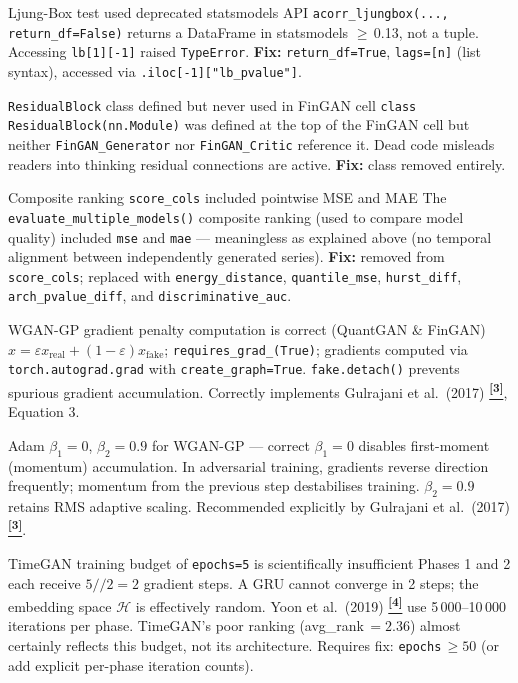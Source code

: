 \documentclass[10pt]{article}
\newcommand{\tcite}[1]{%
  \hyperlink{R:#1}{\textsuperscript{\scriptsize\textbf{[#1]}}}}
\begin{document}
%
  {Ljung-Box test used deprecated statsmodels API}%
  {\texttt{acorr\_ljungbox(..., return\_df=False)} returns a DataFrame in statsmodels $\geq$\,0.13, not a tuple. Accessing \texttt{lb[1][-1]} raised \texttt{TypeError}. \textbf{Fix:} \texttt{return\_df=True}, \texttt{lags=[n]} (list syntax), accessed via \texttt{.iloc[-1]["lb\_pvalue"]}.}

%
  {\texttt{ResidualBlock} class defined but never used in FinGAN cell}%
  {\texttt{class ResidualBlock(nn.Module)} was defined at the top of the FinGAN cell but neither \texttt{FinGAN\_Generator} nor \texttt{FinGAN\_Critic} reference it. Dead code misleads readers into thinking residual connections are active. \textbf{Fix:} class removed entirely.}

%
  {Composite ranking \texttt{score\_cols} included pointwise MSE and MAE}%
  {The \texttt{evaluate\_multiple\_models()} composite ranking (used to compare model quality) included \texttt{mse} and \texttt{mae} --- meaningless as explained above (no temporal alignment between independently generated series). \textbf{Fix:} removed from \texttt{score\_cols}; replaced with \texttt{energy\_distance}, \texttt{quantile\_mse}, \texttt{hurst\_diff}, \texttt{arch\_pvalue\_diff}, and \texttt{discriminative\_auc}.}

%
  {WGAN-GP gradient penalty computation is correct (QuantGAN \& FinGAN)}%
  {$\hat{x} = \varepsilon x_\text{real} + (1-\varepsilon)x_\text{fake}$; \texttt{requires\_grad\_(True)}; gradients computed via \texttt{torch.autograd.grad} with \texttt{create\_graph=True}. \texttt{fake.detach()} prevents spurious gradient accumulation. Correctly implements Gulrajani et al.\ (2017)\tcite{3}, Equation 3.}

%
  {Adam $\beta_1=0$, $\beta_2=0.9$ for WGAN-GP --- correct}%
  {$\beta_1=0$ disables first-moment (momentum) accumulation. In adversarial training, gradients reverse direction frequently; momentum from the previous step destabilises training. $\beta_2=0.9$ retains RMS adaptive scaling. Recommended explicitly by Gulrajani et al.\ (2017)\tcite{3}.}

%
  {TimeGAN training budget of \texttt{epochs=5} is scientifically insufficient}%
  {Phases 1 and 2 each receive $5//2=2$ gradient steps. A GRU cannot converge in 2 steps; the embedding space $\mathcal{H}$ is effectively random. Yoon et al.\ (2019)\tcite{4} use 5\,000--10\,000 iterations per phase. TimeGAN's poor ranking (avg\_rank\,$=2.36$) almost certainly reflects this budget, not its architecture. Requires fix: \texttt{epochs}\,$\geq 50$ (or add explicit per-phase iteration counts).}
\end{document}
